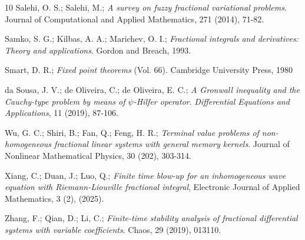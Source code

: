 \documentclass[reqno]{amsart}
\begin{document}
\begin{thebibliography}{10}
Salehi, O. S.; Salehi, M.;
\emph{A survey on fuzzy fractional variational problems}. 
Journal of Computational and Applied Mathematics, 271 (2014), 71-82.

Samko, S. G.; Kilbas, A. A.; Marichev, O. I.;
\emph{Fractional integrals and derivatives: Theory and applications}.
Gordon and Breach, 1993.

Smart, D. R.;
\emph{Fixed point theorems} (Vol. 66). Cambridge University Press, 1980

da Sousa, J. V.; de Oliveira, C.; de Oliveira, E. C.;
\emph{A Gronwall inequality and the Cauchy-type problem by means of 
$\psi$-Hilfer operator}. 
\emph{Differential Equations and Applications}, 11 (2019), 87-106.

Wu, G. C.; Shiri, B.; Fan, Q.; Feng, H. R.;
\emph{Terminal value problems of non-homogeneous fractional linear systems with 
general memory kernels}. Journal of Nonlinear Mathematical Physics, 30 (202), 303-314.

Xiang, C.; Duan, J.; Luo, Q.;
\emph{Finite time blow-up for an inhomogeneous wave equation with Riemann-Liouville
fractional integral}, Electronic Journal of Applied Mathematics, 3 (2), (2025).

Zhang, F.; Qian, D.; Li, C.;
\emph{Finite-time stability analysis of fractional differential systems 
with variable coefficients}. Chaos, 29 (2019), 013110.

\end{thebibliography}
\end{document}
